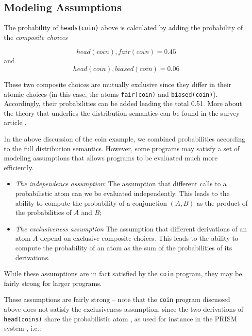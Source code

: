 \subsection{Modeling Assumptions}
The probability of  \texttt{heads(coin)} above is calculated by adding the probability of the
{\em composite choices}

\[ head(coin),fair(coin) = 0.45 \]
and 
\[ head(coin),biased(coin) = 0.06\]

These two composite choices are mutually exclusive since they differ
in their atomic choices (in this case, the atoms {\tt fair(coin)} and
{\tt biased(coin)}).  Accordingly, their probabilities can be added
leading the total 0.51.  More about the theory that underlies the
distribution semantics can be found in the survey article
\cite{RigS15}.

In the above discussion of the coin example, we combined probabilities
according to the full distribution semantics.  However, some programs
may satisfy a set of modeling assumptions that allows programs to be
evaluated much more efficiently.
%
\begin{itemize}
\item {\em The independence assumption}: The assumption that different
  calls to a probabilistic atom can we be evaluated independently.
  This leads to the ability to compute the probability of a
  conjunction $(A,B)$ as the product of the probabilities of $A$ and
  $B$;
\item {\em The exclusiveness assumption} The assumption that different
  derivations of an atom $A$ depend on exclusive composite choices.
  This leads to the ability to compute the probability of an atom as
  the sum of the probabilities of its derivations.
\end{itemize}
%
While these assumptions are in fact satisfied by the {\tt coin}
program, they may be fairly strong for larger programs.

These assumptions are fairly strong -- note that the {\tt coin}
program discussed above does not satisfy the exclusiveness assumption,
since the two derivations of {\tt head(coins)} share the probabilistic
atom , as used for instance in the PRISM system
\cite{DBLP:conf/ijcai/SatoK97}, i.e.:

